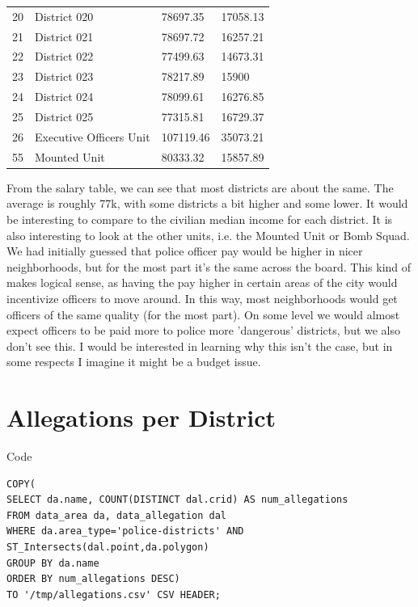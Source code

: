 \documentclass{article}
\begin{document}
\begin{table}[h]
\begin{tabular}{|l|l|l|l|}
20         & District 020                            & 78697.35        & 17058.13    \\
21         & District 021                            & 78697.72        & 16257.21    \\
22         & District 022                            & 77499.63        & 14673.31    \\
23         & District 023                            & 78217.89        & 15900       \\
24         & District 024                            & 78099.61        & 16276.85    \\
25         & District 025                            & 77315.81        & 16729.37    \\
26         & Executive Officers Unit                 & 107119.46       & 35073.21    \\

55         & Mounted Unit                            & 80333.32        & 15857.89   
\\
\hline
\end{tabular}
\end{table}

From the salary table, we can see that most districts are about the same. The average is roughly 77k, with some districts a bit higher and some lower. It would be interesting to compare to the civilian median income for each district. It is also interesting to look at the other units, i.e. the Mounted Unit or Bomb Squad. We had initially guessed that police officer pay would be higher in nicer neighborhoods, but for the most part it's the same across the board. This kind of makes logical sense, as having the pay higher in certain areas of the city would incentivize officers to move around. In this way, most neighborhoods would get officers of the same quality (for the most part). On some level we would almost expect officers to be paid more to police more 'dangerous' districts, but we also don't see this. I would be interested in learning why this isn't the case, but in some respects I imagine it might be a budget issue.

\FloatBarrier
\section{Allegations per District}

\begin{center}
Code
\end{center}
\begin{lstlisting}[frame=single]
COPY(
SELECT da.name, COUNT(DISTINCT dal.crid) AS num_allegations
FROM data_area da, data_allegation dal
WHERE da.area_type='police-districts' AND ST_Intersects(dal.point,da.polygon)
GROUP BY da.name
ORDER BY num_allegations DESC)
TO '/tmp/allegations.csv' CSV HEADER;
\end{lstlisting}
\end{document}

